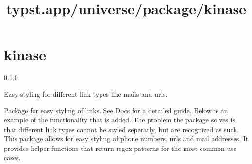 \title{typst.app/universe/package/kinase}

\label{banner}
\section{kinase}\label{kinase}

{ 0.1.0 }

Easy styling for different link types like mails and urls.

\label{readme}
Package for easy styling of links. See
\href{https://github.com/typst/packages/raw/main/packages/preview/kinase/0.1.0/docs/manual.pdf}{Docs}
for a detailed guide. Below is an example of the functionality that is
added. The problem the package solves is that different link types
cannot be styled seperatly, but are recognized as such. This package
allows for easy styling of phone numbers, urls and mail addresses. It
provides helper functions that return regex patterns for the most common
use cases.

\begin{Shaded}
\begin{Highlighting}[]






\end{Highlighting}
\end{Shaded}


